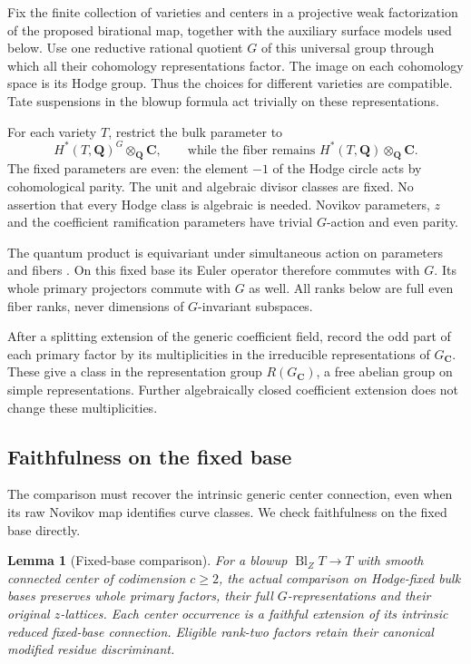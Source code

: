 \documentclass[11pt]{article}
\newtheorem{lemma}[theorem]{Lemma}
\newcommand{\Q}{\mathbf Q}
\newcommand{\C}{\mathbf C}
\newcommand{\Bl}{\operatorname{Bl}}
\begin{document}
Fix the finite collection of varieties and centers in a projective weak
factorization of the proposed birational map, together with the auxiliary
surface models used below. Use one reductive rational
quotient $G$ of this universal group through which all their cohomology
representations factor. The image on each cohomology space is its Hodge
group. Thus the choices for different varieties are compatible. Tate
suspensions in the blowup formula act trivially on these representations.

For each variety $T$, restrict the bulk parameter to
\[
 H^*(T,\Q)^G\otimes_\Q\C,
 \qquad\text{while the fiber remains }H^*(T,\Q)\otimes_\Q\C.
\]
The fixed parameters are even: the element $-1$ of the Hodge circle acts
by cohomological parity. The unit and algebraic divisor classes are fixed.
No assertion that every Hodge class is algebraic is needed. Novikov
parameters, $z$ and the coefficient ramification parameters have trivial
$G$-action and even parity.

The quantum product is equivariant under simultaneous action on parameters
and fibers \cite[Lemma~7]{IH}. On this fixed base its Euler operator
therefore commutes with $G$. Its whole primary projectors commute with $G$
as well. All ranks below are full even fiber ranks, never dimensions of
$G$-invariant subspaces.

After a splitting extension of the generic coefficient field, record the
odd part of each primary factor by its multiplicities in the irreducible
representations of $G_\C$. These give a class in the representation group
$R(G_\C)$, a free abelian group on simple representations. Further
algebraically closed coefficient extension does not change these
multiplicities.

\subsection{Faithfulness on the fixed base}

The comparison must recover the intrinsic generic center connection, even
when its raw Novikov map identifies curve classes. We check faithfulness
on the fixed base directly.

\begin{lemma}[Fixed-base comparison]
\label{lem:prototype-fixed-comparison}
For a blowup $\Bl_ZT\to T$ with smooth connected center of codimension
$c\geq2$, the actual comparison on Hodge-fixed bulk bases preserves whole
primary factors, their full $G$-representations and their original
$z$-lattices. Each center occurrence is a faithful extension of its
intrinsic reduced fixed-base connection. Eligible rank-two factors retain
their canonical modified residue discriminant.
\end{lemma}
\end{document}
